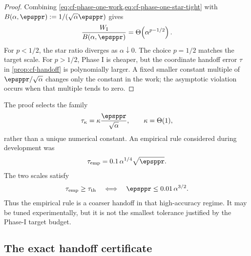 \begin{proof}
Combining \cref{eq:cf-phase-one-work,eq:cf-phase-one-star-tight} with
\(B(\alpha,\epsppr):=1/(\sqrt\alpha\epsppr)\) gives
\begin{equation}
    \frac{W_{\rm I}}{B(\alpha,\epsppr)}
    =\Theta\!\left(\alpha^{p-1/2}\right).
    \label{eq:cf-power-ratio}
\end{equation}
For \(p<1/2\), the star ratio diverges as \(\alpha\downarrow0\).  The choice
\(p=1/2\) matches the target scale.  For \(p>1/2\), Phase I is cheaper, but
the coordinate handoff error \(\tau\) in
\cref{prop:cf-handoff} is polynomially larger.  A fixed smaller constant
multiple of \(\epsppr/\sqrt\alpha\) changes only the constant in the work;
the asymptotic violation occurs when that multiple tends to zero.
\end{proof}

\begin{remark}
\label{rem:cf-empirical-switch}
The proof selects the family
\begin{equation}
    \tau_\kappa=\kappa\frac{\epsppr}{\sqrt\alpha},
    \qquad \kappa=\Theta(1),
    \label{eq:cf-kappa-switch}
\end{equation}
rather than a unique numerical constant.  An empirical rule considered during
development was
\begin{equation}
    \tau_{\rm emp}=0.1\,\alpha^{1/4}\sqrt\epsppr.
    \label{eq:cf-empirical-switch}
\end{equation}
The two scales satisfy
\begin{equation}
    \tau_{\rm emp}\geq\tau_{\rm th}
    \quad\Longleftrightarrow\quad
    \epsppr\leq0.01\,\alpha^{3/2}.
    \label{eq:cf-switch-comparison}
\end{equation}
Thus the empirical rule is a coarser handoff in that high-accuracy regime.  It
may be tuned experimentally, but it is not the smallest tolerance justified
by the Phase-I target budget.
\end{remark}

\subsection{The exact handoff certificate}
\label{subsec:cf-handoff}

